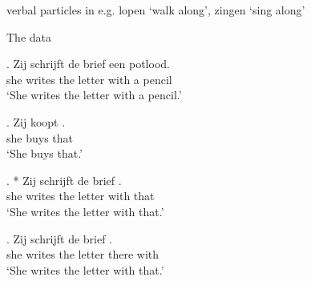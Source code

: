 \documentclass[xcolor=dvipsnames,10pt]{beamer}
\begin{document}
\begin{frame}


\vspace{1em}
\pause

verbal particles in e.g. lopen `walk along', zingen `sing along'

\vspace{1em}
	\pause



\end{frame}




\begin{frame}{The data}

\exg. Zij schrijft de brief  een potlood.\\
 she writes the letter with a pencil\\
 `She writes the letter with a pencil.'

\pause

\exg. Zij koopt .\\
 she buys that\\
 `She buys that.'

\pause

\exg. * Zij schrijft de brief  .\\
 she writes the letter with that\\
 `She writes the letter with that.'

\pause

\exg. Zij schrijft de brief  .\\
 she writes the letter there with\\
 `She writes the letter with that.'

\end{frame}
\end{document}
